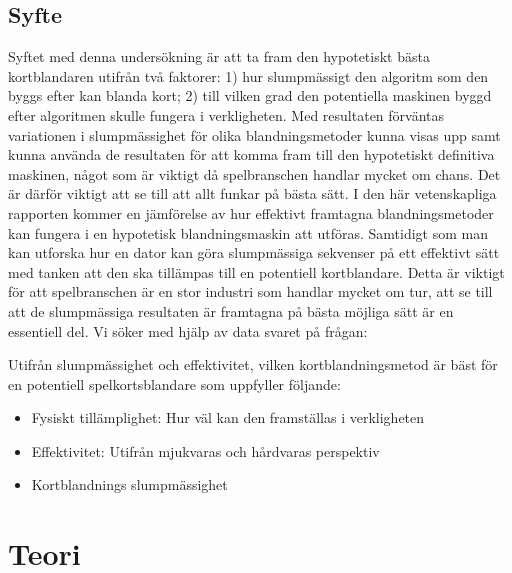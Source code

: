 \documentclass[swedish,a4paper]{article}
\begin{document}
\subsection{Syfte}
\label{sec:purpose}
Syftet med denna undersökning är att ta fram den hypotetiskt bästa kortblandaren
utifrån två faktorer: 1) hur slumpmässigt den algoritm som den byggs efter kan
blanda kort; 2) till vilken grad den potentiella maskinen byggd efter algoritmen
skulle fungera i verkligheten. Med resultaten förväntas variationen i
slumpmässighet för olika blandningsmetoder kunna visas upp samt kunna använda de
resultaten för att komma fram till den hypotetiskt definitiva maskinen, något
som är viktigt då spelbranschen handlar mycket om chans. Det är därför viktigt
att se till att allt funkar på bästa sätt. I den här vetenskapliga rapporten
kommer en jämförelse av hur effektivt framtagna blandningsmetoder kan fungera i
en hypotetisk blandningsmaskin att utföras. Samtidigt som man kan utforska hur
en dator kan göra slumpmässiga sekvenser på ett effektivt sätt med tanken att
den ska tillämpas till en potentiell kortblandare. Detta är viktigt för att
spelbranschen är en stor industri som handlar mycket om tur, att se till att de
slumpmässiga resultaten är framtagna på bästa möjliga sätt är en essentiell del.
Vi söker med hjälp av data svaret på frågan:

Utifrån slumpmässighet och effektivitet, vilken kortblandningsmetod är bäst för
en potentiell spelkortsblandare som uppfyller följande:
\begin{itemize}
	\item Fysiskt tillämplighet: Hur väl kan den framställas i verkligheten 

	\item Effektivitet: Utifrån mjukvaras och hårdvaras perspektiv
        \item Kortblandnings slumpmässighet
\end{itemize}


\section{Teori}
%
\end{document}
